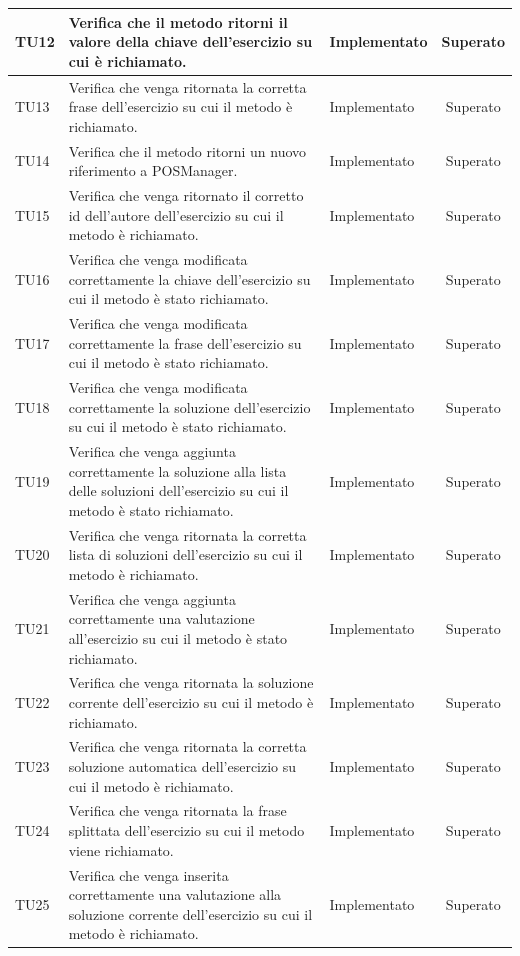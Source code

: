 \begin{longtable}{|>{\centering\arraybackslash}m{1.6cm}|>{\centering\arraybackslash}m{6.41cm}|>{\centering\arraybackslash}m{3.1cm}| c |}
		TU12 & Verifica che il metodo ritorni il valore della chiave dell'esercizio su cui è richiamato. & Implementato & Superato  \\ \hline
		TU13 & Verifica che venga ritornata la corretta frase dell'esercizio su cui il metodo è richiamato. & Implementato & Superato  \\ \hline
		TU14 & Verifica che il metodo ritorni un nuovo riferimento a POSManager. & Implementato & Superato \\ \hline
		TU15 & Verifica che venga ritornato il corretto id dell'autore dell'esercizio su cui il metodo è richiamato. & Implementato & Superato  \\ \hline
		TU16 & Verifica che venga modificata correttamente la chiave dell'esercizio su cui il metodo è stato richiamato. & Implementato & Superato \\ \hline
		TU17 & Verifica che venga modificata correttamente la frase dell'esercizio su cui il metodo è stato richiamato. & Implementato & Superato \\ \hline
		TU18 & Verifica che venga modificata correttamente la soluzione dell'esercizio su cui il metodo è stato richiamato. & Implementato & Superato \\ \hline
		TU19 & Verifica che venga aggiunta correttamente la soluzione alla lista delle soluzioni dell'esercizio su cui il metodo è stato richiamato. & Implementato & Superato \\ \hline
		TU20 & Verifica che venga ritornata la corretta lista di soluzioni dell'esercizio su cui il metodo è richiamato. & Implementato & Superato \\ \hline
		TU21 & Verifica che venga aggiunta correttamente una valutazione all'esercizio su cui il metodo è stato richiamato. & Implementato & Superato \\ \hline
		TU22 & Verifica che venga ritornata la soluzione corrente dell'esercizio su cui il metodo è richiamato. & Implementato & Superato \\ \hline
		TU23 & Verifica che venga ritornata la corretta soluzione automatica dell'esercizio su cui il metodo è richiamato. & Implementato & Superato \\ \hline
		TU24 & Verifica che venga ritornata la frase splittata dell'esercizio su cui il metodo viene richiamato. & Implementato & Superato \\ \hline
		TU25 & Verifica che venga inserita correttamente una valutazione alla soluzione corrente dell'esercizio su cui il metodo è richiamato. & Implementato & Superato \\ \hline		

\end{longtable}
